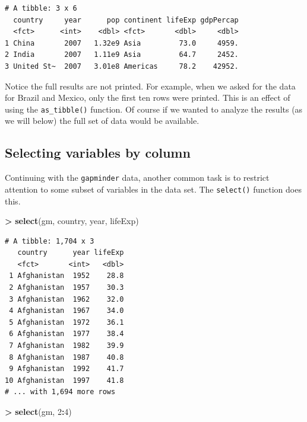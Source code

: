 \documentclass[
]{krantz}
\makeatletter
\newenvironment{Shaded}{\begin{snugshade}}{\end{snugshade}}
\newcommand{\DecValTok}[1]{\textcolor[rgb]{0.06,0.06,0.06}{#1}}
\newcommand{\KeywordTok}[1]{\textcolor[rgb]{0.27,0.27,0.27}{\textbf{#1}}}
\newcommand{\NormalTok}[1]{#1}
\newcommand{\OperatorTok}[1]{\textcolor[rgb]{0.43,0.43,0.43}{\textbf{#1}}}
\newcommand{\StringTok}[1]{\textcolor[rgb]{0.5,0.5,0.5}{#1}}
\newenvironment{kframe}{%
\medskip{}
\setlength{\fboxsep}{.8em}
 \def\at@end@of@kframe{}%
 \ifinner\ifhmode%
  \def\at@end@of@kframe{\end{minipage}}%
  \begin{minipage}{\columnwidth}%
 \fi\fi%
 \def\FrameCommand##1{\hskip\@totalleftmargin \hskip-\fboxsep
 \colorbox{shadecolor}{##1}\hskip-\fboxsep
     \hskip-\linewidth \hskip-\@totalleftmargin \hskip\columnwidth}%
 \MakeFramed {\advance\hsize-\width
   \@totalleftmargin\z@ \linewidth\hsize
   \@setminipage}}%
 {\par\unskip\endMakeFramed%
 \at@end@of@kframe}
\renewenvironment{Shaded}{\begin{kframe}}{\end{kframe}}
\makeatother
\begin{document}
\begin{verbatim}
# A tibble: 3 x 6
  country     year      pop continent lifeExp gdpPercap
  <fct>      <int>    <dbl> <fct>       <dbl>     <dbl>
1 China       2007   1.32e9 Asia         73.0     4959.
2 India       2007   1.11e9 Asia         64.7     2452.
3 United St~  2007   3.01e8 Americas     78.2    42952.
\end{verbatim}

Notice the full results are not printed. For example, when we asked for the data for Brazil and Mexico, only the first ten rows were printed. This is an effect of using the \texttt{as\_tibble()} function. Of course if we wanted to analyze the results (as we will below) the full set of data would be available.

\hypertarget{selecting-variables-by-column}{%
\subsection{Selecting variables by column}\label{selecting-variables-by-column}}

Continuing with the \texttt{gapminder} data, another common task is to restrict attention to some subset of variables in the data set. The \texttt{select()} function does this.

\begin{Shaded}
\begin{Highlighting}[]
\OperatorTok{\textgreater{}}\StringTok{ }\KeywordTok{select}\NormalTok{(gm, country, year, lifeExp)}
\end{Highlighting}
\end{Shaded}

\begin{verbatim}
# A tibble: 1,704 x 3
   country      year lifeExp
   <fct>       <int>   <dbl>
 1 Afghanistan  1952    28.8
 2 Afghanistan  1957    30.3
 3 Afghanistan  1962    32.0
 4 Afghanistan  1967    34.0
 5 Afghanistan  1972    36.1
 6 Afghanistan  1977    38.4
 7 Afghanistan  1982    39.9
 8 Afghanistan  1987    40.8
 9 Afghanistan  1992    41.7
10 Afghanistan  1997    41.8
# ... with 1,694 more rows
\end{verbatim}

\begin{Shaded}
\begin{Highlighting}[]
\OperatorTok{\textgreater{}}\StringTok{ }\KeywordTok{select}\NormalTok{(gm, }\DecValTok{2}\OperatorTok{:}\DecValTok{4}\NormalTok{)}
\end{Highlighting}
\end{Shaded}
\end{document}
